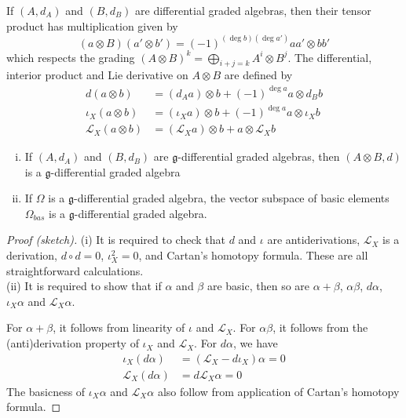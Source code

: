 If $(A,d_A)$ and  $(B,d_B)$ are differential graded algebras, then their tensor product has
multiplication given by 
\begin{equation} \label{eq:tensor_mult}
	 (a\otimes B)(a'\otimes b') = (-1)^{(\deg b)(\deg a')}aa'\otimes bb'
\end{equation}
which respects the grading $(A\otimes B)^k = \bigoplus_{i+j= k} A^i\otimes B^j$.
The differential, interior product and Lie derivative on $A\otimes B$ are defined by 
\begin{align}
	d(a\otimes b) &= (d_A a)\otimes b + (-1)^{\deg a}a\otimes d_Bb \nonumber \\
	\iota_X(a\otimes b) &= (\iota_X a)\otimes b +(-1)^{\deg a}a\otimes \iota_Xb
	\label{eq:tensor_ops} \\
	\mathcal{L}_X(a\otimes b) &= (\mathcal{L}_X a)\otimes b +a\otimes\mathcal{L}_Xb
	\nonumber
\end{align}
 
\begin{prop}  \label{prop:dga_operations}
	\phantom{}	%
	\begin{enumerate}[(i), leftmargin=\parindent]
	    \item 
			If $(A,d_A)$ and  $(B,d_B)$ are $\mathfrak{g}$-differential graded 
			algebras, then $(A\otimes B,d)$ is a $\mathfrak{g}$-differential graded 
			algebra
		\item 
	If $\Omega$ is a  $\mathfrak{g}$-differential graded algebra, the vector
	subspace of basic elements $\Omega_{bas}$ is a $\mathfrak{g}$-differential
	graded algebra.
	\end{enumerate}
\end{prop}
\begin{proof}[Proof (sketch)]
	(i) It is required to check that $d$ and $\iota$ are antiderivations,
	$\mathcal{L}_X$ is a derivation, $d\circ d = 0$,  $\iota_X^2=0$, and
	Cartan's homotopy formula. These are all straightforward calculations.\\
	(ii) It is required to show that if $\alpha$ and  $\beta$ are basic, then so
	are $\alpha+\beta$,  $\alpha\beta$,  $d\alpha$,  $\iota_X \alpha$ and
	$\mathcal{L}_X\alpha $. 

	For $\alpha+\beta$, it follows from linearity of  $\iota$ and
	$\mathcal{L}_X$. For $\alpha\beta$, it follows from the (anti)derivation
	property of $\iota_X$ and  $\mathcal{L}_X$. For $d\alpha$, we have 
	 \begin{align*}
		 \iota_X(d\alpha) &= (\mathcal{L}_X-d\iota_X)\alpha = 0 \tag{by Cartan's
		 homotopy formula} \\
			 \mathcal{L}_X(d\alpha) &= d\mathcal{L}_X \alpha = 0 
		\tag{again by Cartan's homotopy formula}
	 \end{align*} 
	The basicness of $\iota_X\alpha$ and  $\mathcal{L}_X\alpha$ also follow 
	from application of Cartan's homotopy formula.
\end{proof}


